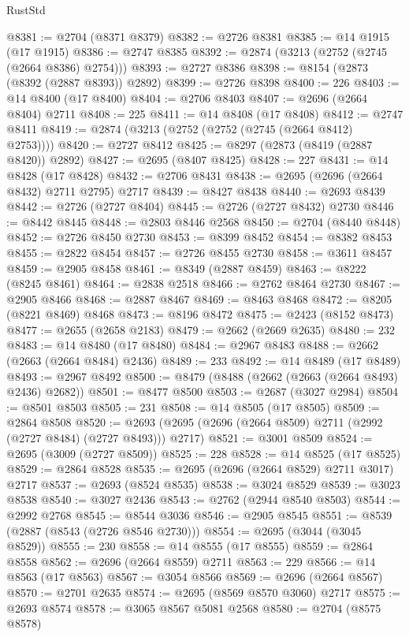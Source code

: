 \begin{lexlean}{RustStd}
\begin{coremodule}
@8381 := @2704 (@8371 @8379)
@8382 := @2726 @8381
@8385 := @14 @1915 (@17 @1915)
@8386 := @2747 @8385
@8392 := @2874 (@3213 (@2752 (@2745 (@2664 @8386) @2754)))
@8393 := @2727 @8386
@8398 := @8154 (@2873 (@8392 (@2887 @8393)) @2892)
@8399 := @2726 @8398
@8400 := 226
@8403 := @14 @8400 (@17 @8400)
@8404 := @2706 @8403
@8407 := @2696 (@2664 @8404) @2711
@8408 := 225
@8411 := @14 @8408 (@17 @8408)
@8412 := @2747 @8411
@8419 := @2874 (@3213 (@2752 (@2752 (@2745 (@2664 @8412) @2753))))
@8420 := @2727 @8412
@8425 := @8297 (@2873 (@8419 (@2887 @8420)) @2892)
@8427 := @2695 (@8407 @8425)
@8428 := 227
@8431 := @14 @8428 (@17 @8428)
@8432 := @2706 @8431
@8438 := @2695 (@2696 (@2664 @8432) @2711 @2795) @2717
@8439 := @8427 @8438
@8440 := @2693 @8439
@8442 := @2726 (@2727 @8404)
@8445 := @2726 (@2727 @8432) @2730
@8446 := @8442 @8445
@8448 := @2803 @8446 @2568
@8450 := @2704 (@8440 @8448)
@8452 := @2726 @8450 @2730
@8453 := @8399 @8452
@8454 := @8382 @8453
@8455 := @2822 @8454
@8457 := @2726 @8455 @2730
@8458 := @3611 @8457
@8459 := @2905 @8458
@8461 := @8349 (@2887 @8459)
@8463 := @8222 (@8245 @8461)
@8464 := @2838 @2518
@8466 := @2762 @8464 @2730
@8467 := @2905 @8466
@8468 := @2887 @8467
@8469 := @8463 @8468
@8472 := @8205 (@8221 @8469) @8468
@8473 := @8196 @8472
@8475 := @2423 (@8152 @8473)
@8477 := @2655 (@2658 @2183)
@8479 := @2662 (@2669 @2635)
@8480 := 232
@8483 := @14 @8480 (@17 @8480)
@8484 := @2967 @8483
@8488 := @2662 (@2663 (@2664 @8484) @2436)
@8489 := 233
@8492 := @14 @8489 (@17 @8489)
@8493 := @2967 @8492
@8500 := @8479 (@8488 (@2662 (@2663 (@2664 @8493) @2436) @2682))
@8501 := @8477 @8500
@8503 := @2687 (@3027 @2984)
@8504 := @8501 @8503
@8505 := 231
@8508 := @14 @8505 (@17 @8505)
@8509 := @2864 @8508
@8520 := @2693 (@2695 (@2696 (@2664 @8509) @2711 (@2992 (@2727 @8484) (@2727 @8493))) @2717)
@8521 := @3001 @8509
@8524 := @2695 (@3009 (@2727 @8509))
@8525 := 228
@8528 := @14 @8525 (@17 @8525)
@8529 := @2864 @8528
@8535 := @2695 (@2696 (@2664 @8529) @2711 @3017) @2717
@8537 := @2693 (@8524 @8535)
@8538 := @3024 @8529
@8539 := @3023 @8538
@8540 := @3027 @2436
@8543 := @2762 (@2944 @8540 @8503)
@8544 := @2992 @2768
@8545 := @8544 @3036
@8546 := @2905 @8545
@8551 := @8539 (@2887 (@8543 (@2726 @8546 @2730)))
@8554 := @2695 (@3044 (@3045 @8529))
@8555 := 230
@8558 := @14 @8555 (@17 @8555)
@8559 := @2864 @8558
@8562 := @2696 (@2664 @8559) @2711
@8563 := 229
@8566 := @14 @8563 (@17 @8563)
@8567 := @3054 @8566
@8569 := @2696 (@2664 @8567)
@8570 := @2701 @2635
@8574 := @2695 (@8569 @8570 @3060) @2717
@8575 := @2693 @8574
@8578 := @3065 @8567 @5081 @2568
@8580 := @2704 (@8575 @8578)

\end{coremodule}
\end{lexlean}
